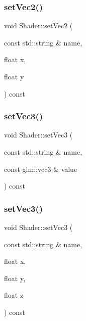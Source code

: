 \mbox{\label{classShader_afb91bc9e954bf590857c96ab1331b0ec}} 
\subsubsection{\texorpdfstring{set\+Vec2()}{setVec2()}\hspace{0.1cm}{\footnotesize\ttfamily [2/2]}}
{\footnotesize\ttfamily void Shader\+::set\+Vec2 (\begin{DoxyParamCaption}\item[{const std\+::string \&}]{name,  }\item[{float}]{x,  }\item[{float}]{y }\end{DoxyParamCaption}) const\hspace{0.3cm}{\ttfamily [inline]}}

\mbox{\label{classShader_aeb021061c5d451329d92257b07dbfec3}} 
\subsubsection{\texorpdfstring{set\+Vec3()}{setVec3()}\hspace{0.1cm}{\footnotesize\ttfamily [1/2]}}
{\footnotesize\ttfamily void Shader\+::set\+Vec3 (\begin{DoxyParamCaption}\item[{const std\+::string \&}]{name,  }\item[{const glm\+::vec3 \&}]{value }\end{DoxyParamCaption}) const\hspace{0.3cm}{\ttfamily [inline]}}

\mbox{\label{classShader_a90092c25b7dc23964c465b93887300f9}} 
\subsubsection{\texorpdfstring{set\+Vec3()}{setVec3()}\hspace{0.1cm}{\footnotesize\ttfamily [2/2]}}
{\footnotesize\ttfamily void Shader\+::set\+Vec3 (\begin{DoxyParamCaption}\item[{const std\+::string \&}]{name,  }\item[{float}]{x,  }\item[{float}]{y,  }\item[{float}]{z }\end{DoxyParamCaption}) const\hspace{0.3cm}{\ttfamily [inline]}}

